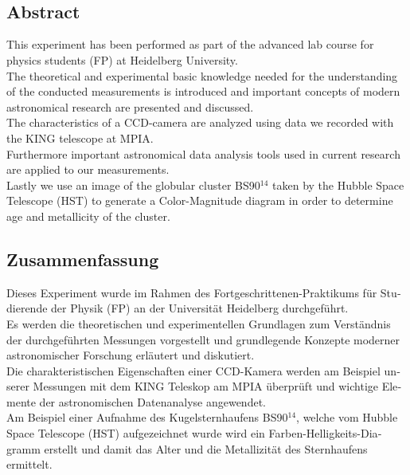 \makeatletter

\begin{centering}
\textbf{\Large\@title} \\
\vspace{.1cm}
\small\@author \\
\end{centering}

\makeatother

\vfill
 
{\let\raggedsection\centering
\begin{centering}
\section*{Abstract }
\end{centering}
This experiment has been performed as part of the advanced lab course for physics students (FP) at Heidelberg University. \\
The theoretical and experimental basic knowledge needed for the understanding of the conducted measurements is introduced and important concepts of modern astronomical research are presented and discussed.\\
The characteristics of a CCD-camera are analyzed using data we recorded with the KING telescope at MPIA. \\
Furthermore important astronomical data analysis tools used in current research are applied to our measurements. \\
Lastly we use an image of the globular cluster BS90$^{14}$ taken by the Hubble Space Telescope (HST) to generate a Color-Magnitude diagram in order to determine age and metallicity of the cluster.


\vfill
\begin{german}
\begin{centering}
\section*{Zusammenfassung}
\end{centering}
Dieses Experiment wurde im Rahmen des Fortgeschrittenen-Praktikums für Studierende der Physik (FP) an der Universität Heidelberg durchgeführt. \\
Es werden die theoretischen und experimentellen Grundlagen zum Verständnis der durchgeführten Messungen vorgestellt und grundlegende Konzepte moderner astronomischer Forschung erläutert und diskutiert. \\
Die charakteristischen Eigenschaften einer CCD-Kamera werden am Beispiel unserer Messungen mit dem KING Teleskop am MPIA überprüft und wichtige Elemente der astronomischen Datenanalyse angewendet. \\
Am Beispiel einer Aufnahme des Kugelsternhaufens BS90$^{14}$, welche vom Hubble Space Telescope (HST) aufgezeichnet wurde wird ein Farben-Helligkeits-Diagramm erstellt und damit das Alter und die Metallizität des Sternhaufens ermittelt. 

\end{german}}
\vfill
\blankpage